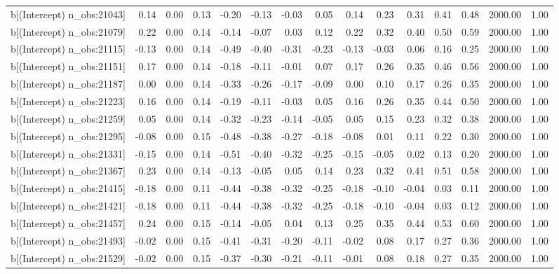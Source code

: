 \begin{table}[ht]
\begin{tabular}{rrrrrrrrrrrrrrr}
  b[(Intercept) n\_obs:21043] & 0.14 & 0.00 & 0.13 & -0.20 & -0.13 & -0.03 & 0.05 & 0.14 & 0.23 & 0.31 & 0.41 & 0.48 & 2000.00 & 1.00 \\ 
  b[(Intercept) n\_obs:21079] & 0.22 & 0.00 & 0.14 & -0.14 & -0.07 & 0.03 & 0.12 & 0.22 & 0.32 & 0.40 & 0.50 & 0.59 & 2000.00 & 1.00 \\ 
  b[(Intercept) n\_obs:21115] & -0.13 & 0.00 & 0.14 & -0.49 & -0.40 & -0.31 & -0.23 & -0.13 & -0.03 & 0.06 & 0.16 & 0.25 & 2000.00 & 1.00 \\ 
  b[(Intercept) n\_obs:21151] & 0.17 & 0.00 & 0.14 & -0.18 & -0.11 & -0.01 & 0.07 & 0.17 & 0.26 & 0.35 & 0.46 & 0.56 & 2000.00 & 1.00 \\ 
  b[(Intercept) n\_obs:21187] & 0.00 & 0.00 & 0.14 & -0.33 & -0.26 & -0.17 & -0.09 & 0.00 & 0.10 & 0.17 & 0.26 & 0.35 & 2000.00 & 1.00 \\ 
  b[(Intercept) n\_obs:21223] & 0.16 & 0.00 & 0.14 & -0.19 & -0.11 & -0.03 & 0.05 & 0.16 & 0.26 & 0.35 & 0.44 & 0.50 & 2000.00 & 1.00 \\ 
  b[(Intercept) n\_obs:21259] & 0.05 & 0.00 & 0.14 & -0.32 & -0.23 & -0.14 & -0.05 & 0.05 & 0.15 & 0.23 & 0.32 & 0.38 & 2000.00 & 1.00 \\ 
  b[(Intercept) n\_obs:21295] & -0.08 & 0.00 & 0.15 & -0.48 & -0.38 & -0.27 & -0.18 & -0.08 & 0.01 & 0.11 & 0.22 & 0.30 & 2000.00 & 1.00 \\ 
  b[(Intercept) n\_obs:21331] & -0.15 & 0.00 & 0.14 & -0.51 & -0.40 & -0.32 & -0.25 & -0.15 & -0.05 & 0.02 & 0.13 & 0.20 & 2000.00 & 1.00 \\ 
  b[(Intercept) n\_obs:21367] & 0.23 & 0.00 & 0.14 & -0.13 & -0.05 & 0.05 & 0.14 & 0.23 & 0.32 & 0.41 & 0.51 & 0.58 & 2000.00 & 1.00 \\ 
  b[(Intercept) n\_obs:21415] & -0.18 & 0.00 & 0.11 & -0.44 & -0.38 & -0.32 & -0.25 & -0.18 & -0.10 & -0.04 & 0.03 & 0.11 & 2000.00 & 1.00 \\ 
  b[(Intercept) n\_obs:21421] & -0.18 & 0.00 & 0.11 & -0.44 & -0.38 & -0.32 & -0.25 & -0.18 & -0.10 & -0.04 & 0.03 & 0.12 & 2000.00 & 1.00 \\ 
  b[(Intercept) n\_obs:21457] & 0.24 & 0.00 & 0.15 & -0.14 & -0.05 & 0.04 & 0.13 & 0.25 & 0.35 & 0.44 & 0.53 & 0.60 & 2000.00 & 1.00 \\ 
  b[(Intercept) n\_obs:21493] & -0.02 & 0.00 & 0.15 & -0.41 & -0.31 & -0.20 & -0.11 & -0.02 & 0.08 & 0.17 & 0.27 & 0.36 & 2000.00 & 1.00 \\ 
  b[(Intercept) n\_obs:21529] & -0.02 & 0.00 & 0.15 & -0.37 & -0.30 & -0.21 & -0.11 & -0.01 & 0.08 & 0.18 & 0.27 & 0.35 & 2000.00 & 1.00 \\ 

\end{tabular}
\end{table}
